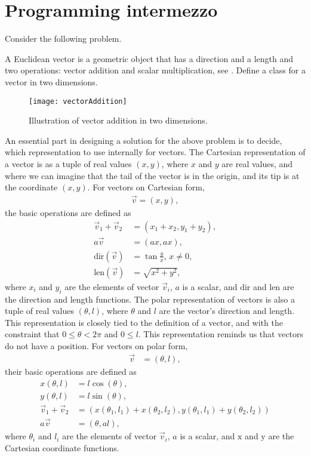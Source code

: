 \section{Programming intermezzo}
Consider the following problem.
\begin{problem}
  A Euclidean vector is a geometric object that has a direction and a length and two operations: vector addition and scalar multiplication, see . Define a class for a vector in two dimensions.
\end{problem}
\begin{figure}
  \centering
  \texttt{[image: vectorAddition]}
  \caption{Illustration of vector addition in two dimensions.}
  \label{fig:vectorAddition}
\end{figure}
An essential part in designing a solution for the above problem is to decide, which representation to use internally for vectors. The Cartesian representation of a vector is as a tuple of real values $(x,y)$, where $x$ and $y$ are real values, and where we can imagine that the tail of the vector is in the origin, and its tip is at the coordinate $(x,y)$. For vectors on Cartesian form,
\begin{align}
  \vec v = (x,y),
\end{align}
the basic operations are defined as
\begin{align}
  \vec v_1 + \vec v_2 &= (x_1+x_2, y_1+y_2),
  \\a\vec v &= (a x,a x),
  \\\text{dir}(\vec v) &= \tan\frac{y}{x},\, x\neq 0,
  \\\text{len}(\vec v) &= \sqrt{x^2+y^2},
\end{align}
where $x_i$ and $y_i$ are the elements of vector $\vec v_i$, $a$ is a scalar, and $\text{dir}$ and $\text{len}$ are the direction and length functions. The polar representation of vectors is also a tuple of real values $(\theta, l)$, where $\theta$ and $l$ are the vector's direction and length. This representation is closely tied to the definition of a vector, and with the constraint that $0 \leq \theta < 2\pi$ and $0 \leq l$. This representation reminds us that vectors do not have a position. For vectors on polar form,
\begin{align}
  \vec v &= (\theta,l),
\end{align}
their basic operations are defined as
\begin{align}
  x(\theta,l) &= l\cos(\theta),
  \\y(\theta,l) &= l\sin(\theta),
  \\\vec v_1 + \vec v_2 &= (x(\theta_1,l_1)+x(\theta_2,l_2), y(\theta_1,l_1)+y(\theta_2,l_2))
  \\a\vec v &= (\theta,a l),
\end{align}
where $\theta_i$ and $l_i$ are the elements of vector $\vec v_i$, $a$ is a scalar, and $\text{x}$ and $\text{y}$ are the Cartesian coordinate functions.

